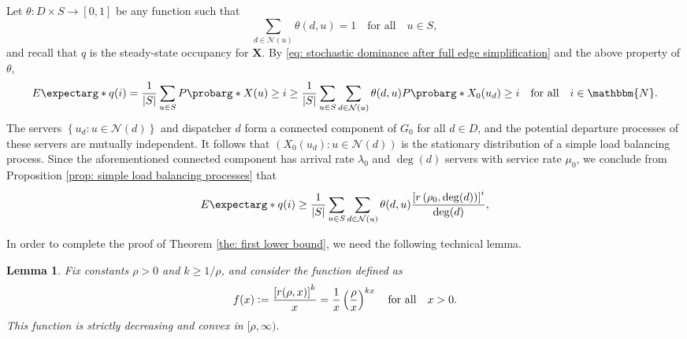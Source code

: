 \documentclass[a4paper, 12pt]{article}
\newtheorem{lemma}{Lemma}
\theoremstyle{definition}
\newcommand{\map}[3]{#1 : #2 \longrightarrow #3}
\newcommand{\set}[2]{\left\{#1 : #2\right\}}
\newcommand{\sett}[2]{\left(#1 : #2\right)}
\newcommand{\defeq}{\vcentcolon=}
\newcommand{\bX}{\boldsymbol{X}}
\newcommand{\calN}{\mathcal{N}}
\newcommand{\N}{\mathbbm{N}}
\newcommand{\expect}{E\expectarg}
\newcommand{\cprob}{P\probarg}
\begin{document}
Let $\map{\theta}{D \times S}{[0, 1]}$ be any function such that
\begin{equation*}
	\sum_{d \in \calN(u)} \theta(d, u) = 1 \quad \text{for all} \quad u \in S,
\end{equation*}
and recall that $q$ is the steady-state occupancy for $\bX$. By \eqref{eq: stochastic dominance after full edge simplification} and the above property of $\theta$,
\begin{equation*}
	\expect*{q(i)} = \frac{1}{|S|}\sum_{u \in S} \cprob*{X(u) \geq i} \geq \frac{1}{|S|}\sum_{u \in S} \sum_{d \in \calN(u)} \theta(d, u) \cprob*{X_0(u_d) \geq i} \quad \text{for all} \quad i \in \N.
\end{equation*}
The servers $\set{u_d}{u \in \calN(d)}$ and dispatcher $d$ form a connected component of $G_0$ for all $d \in D$, and the potential departure processes of these servers are mutually independent. It follows that $\sett{X_0(u_d)}{u \in \calN(d)}$ is the stationary distribution of a simple load balancing process. Since the aforementioned connected component has arrival rate $\lambda_0$ and $\deg(d)$ servers with service rate $\mu_0$, we conclude from Proposition \ref{prop: simple load balancing processes} that
\begin{equation}
	\label{eq: lower bound in terms of convex combinations}
	\expect*{q(i)} \geq \frac{1}{|S|}\sum_{u \in S} \sum_{d \in \calN(u)} \theta(d, u) \frac{\left[r\left(\rho_0, \deg(d)\right)\right]^i}{\deg(d)},
\end{equation}

In order to complete the proof of Theorem \ref{the: first lower bound}, we need the following technical lemma.

\begin{lemma}
	\label{lem: properties of r}
	Fix constants $\rho > 0$ and $k \geq 1 / \rho$, and consider the function defined as
	\begin{equation*}
		f(x) \defeq \frac{\left[r(\rho, x)\right]^k}{x} = \frac{1}{x}\left(\frac{\rho}{x}\right)^{kx} \quad \text{for all} \quad x > 0.
	\end{equation*}
	This function is strictly decreasing and convex in $[\rho, \infty).$
\end{lemma}
\end{document}
